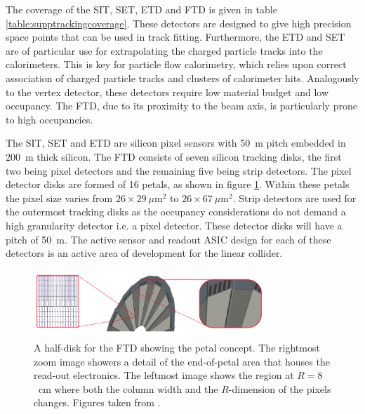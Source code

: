 The coverage of the SIT, SET, ETD and FTD is given in table \ref{table:supptrackingcoverage}.  These detectors are designed to give high precision space points that can be used in track fitting.  Furthermore, the ETD and SET are of particular use for extrapolating the charged particle tracks into the calorimeters.  This is key for particle flow calorimetry, which relies upon correct association of charged particle tracks and clusters of calorimeter hits.  Analogously to the vertex detector, these detectors require low material budget and low occupancy.  The FTD, due to its proximity to the beam axis, is particularly prone to high occupancies.  

The SIT, SET and ETD are silicon pixel sensors with 50~{\mu}m pitch embedded in 200~{\mu}m thick silicon.  The FTD consists of seven silicon tracking disks, the first two being pixel detectors and the remaining five being strip detectors.  The pixel detector disks are formed of 16 petals, as shown in figure \ref{fig:ftd}.  Within these petals the pixel size varies from $26 \times 29~{\mu}\text{m}^{2}$ to $26 \times 67~{\mu}\text{m}^{2}$.  Strip detectors are used for the outermost tracking disks as the occupancy considerations do not demand a high granularity detector i.e. a pixel detector.  These detector disks will have a pitch of 50~{\mu}m.  The active sensor and readout ASIC design for each of these detectors is an active area of development for the linear collider.  

\begin{figure}[h!]
\centering
\includegraphics[width=0.8\textwidth]{LCDetectorsAndPFlow/Plots/Pictures/FTD.png}
\caption[A half-disk for the FTD showing the petal concept.  The rightmost zoom image showers a detail of the end-of-petal area that houses the read-out electronics.  The leftmost image shows the region at $R = 8$~cm where both the column width and the $R$-dimension of the pixels changes.  Figures taken from \cite{Behnke:2013lya}.]{A half-disk for the FTD showing the petal concept.  The rightmost zoom image showers a detail of the end-of-petal area that houses the read-out electronics.  The leftmost image shows the region at $R = 8$~cm where both the column width and the $R$-dimension of the pixels changes.  Figures taken from \cite{Behnke:2013lya}.}
\label{fig:ftd}
\end{figure} 

